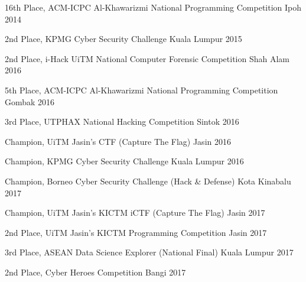 \begin{cvhonors}

  \cvhonor
    {16th Place,}
    {ACM-ICPC Al-Khawarizmi National Programming Competition}
    {Ipoh}
    {2014}

  \cvhonor
    {2nd Place,}
    {KPMG Cyber Security Challenge}
    {Kuala Lumpur}
    {2015}

  \cvhonor
    {2nd Place,}
    {i-Hack UiTM National Computer Forensic Competition}
    {Shah Alam}
    {2016}
        
  \cvhonor
    {5th Place,}
    {ACM-ICPC Al-Khawarizmi National Programming Competition}
    {Gombak}
    {2016}
        
  \cvhonor
    {3rd Place,}
    {UTPHAX National Hacking Competition}
    {Sintok}
    {2016}

  \cvhonor
    {Champion,}
    {UiTM Jasin's CTF (Capture The Flag)}
    {Jasin}
    {2016}
            
  \cvhonor
    {Champion,}
    {KPMG Cyber Security Challenge}
    {Kuala Lumpur}
    {2016}

  \cvhonor
    {Champion,}
    {Borneo Cyber Security Challenge (Hack \& Defense)}
    {Kota Kinabalu}
    {2017}

  \cvhonor
    {Champion,}
    {UiTM Jasin's KICTM iCTF (Capture The Flag) }
    {Jasin}
    {2017}

  \cvhonor
    {2nd Place,}
    {UiTM Jasin's KICTM Programming Competition }
    {Jasin}
    {2017}

  \cvhonor
    {3rd Place,}
    {ASEAN Data Science Explorer (National Final)}
    {Kuala Lumpur}
    {2017}

  \cvhonor
    {2nd Place,}
    {Cyber Heroes Competition}
    {Bangi}
    {2017}


\end{cvhonors}
